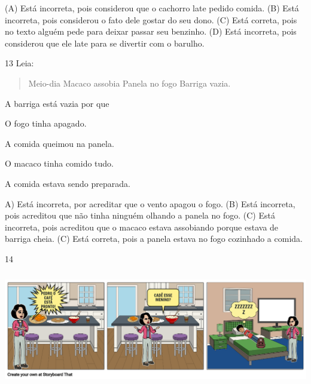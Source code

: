 
(A) Está incorreta, pois considerou que o cachorro late pedido comida.
(B) Está incorreta, pois considerou o fato dele gostar do seu dono.
(C) Está correta, pois no texto alguém pede para deixar passar seu benzinho.
(D) Está incorreta, pois considerou que ele late para se divertir com o barulho.

\num{13} Leia:

\begin{verse}
Meio-dia
Macaco assobia
Panela no fogo
Barriga vazia.
\end{verse}


A barriga está vazia por que

\begin{escolha}
\item O fogo tinha apagado.

\item A comida queimou na panela.

\item O macaco tinha comido tudo.

\item A comida estava sendo preparada.
\end{escolha}


A) Está incorreta, por acreditar que o vento apagou o fogo.
(B) Está incorreta, pois acreditou que não tinha ninguém olhando a panela no fogo.
(C) Está incorreta, pois acreditou que o macaco estava assobiando porque estava de barriga cheia.
(C) Está correta, pois a panela estava no fogo cozinhado a comida.

\num{14}

\includegraphics[width=5.90556in,height=1.95556in]{media/image146.png}

